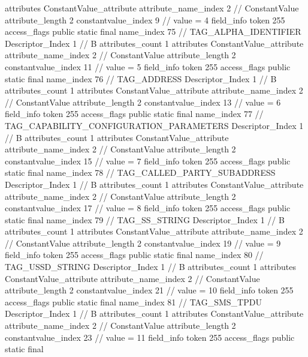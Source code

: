 {{{{{				attributes {
				ConstantValue_attribute {
					attribute_name_index	2		// ConstantValue
					attribute_length	2
					constantvalue_index	9		// value = 4
				}
				}
			}
			field_info {
				token	255
				access_flags	public static final
				name_index	75		// TAG_ALPHA_IDENTIFIER
				Descriptor_Index	1		// B
				attributes_count	1
				attributes {
				ConstantValue_attribute {
					attribute_name_index	2		// ConstantValue
					attribute_length	2
					constantvalue_index	11		// value = 5
				}
				}
			}
			field_info {
				token	255
				access_flags	public static final
				name_index	76		// TAG_ADDRESS
				Descriptor_Index	1		// B
				attributes_count	1
				attributes {
				ConstantValue_attribute {
					attribute_name_index	2		// ConstantValue
					attribute_length	2
					constantvalue_index	13		// value = 6
				}
				}
			}
			field_info {
				token	255
				access_flags	public static final
				name_index	77		// TAG_CAPABILITY_CONFIGURATION_PARAMETERS
				Descriptor_Index	1		// B
				attributes_count	1
				attributes {
				ConstantValue_attribute {
					attribute_name_index	2		// ConstantValue
					attribute_length	2
					constantvalue_index	15		// value = 7
				}
				}
			}
			field_info {
				token	255
				access_flags	public static final
				name_index	78		// TAG_CALLED_PARTY_SUBADDRESS
				Descriptor_Index	1		// B
				attributes_count	1
				attributes {
				ConstantValue_attribute {
					attribute_name_index	2		// ConstantValue
					attribute_length	2
					constantvalue_index	17		// value = 8
				}
				}
			}
			field_info {
				token	255
				access_flags	public static final
				name_index	79		// TAG_SS_STRING
				Descriptor_Index	1		// B
				attributes_count	1
				attributes {
				ConstantValue_attribute {
					attribute_name_index	2		// ConstantValue
					attribute_length	2
					constantvalue_index	19		// value = 9
				}
				}
			}
			field_info {
				token	255
				access_flags	public static final
				name_index	80		// TAG_USSD_STRING
				Descriptor_Index	1		// B
				attributes_count	1
				attributes {
				ConstantValue_attribute {
					attribute_name_index	2		// ConstantValue
					attribute_length	2
					constantvalue_index	21		// value = 10
				}
				}
			}
			field_info {
				token	255
				access_flags	public static final
				name_index	81		// TAG_SMS_TPDU
				Descriptor_Index	1		// B
				attributes_count	1
				attributes {
				ConstantValue_attribute {
					attribute_name_index	2		// ConstantValue
					attribute_length	2
					constantvalue_index	23		// value = 11
				}
				}
			}
			field_info {
				token	255
				access_flags	public static final
}}}}}
